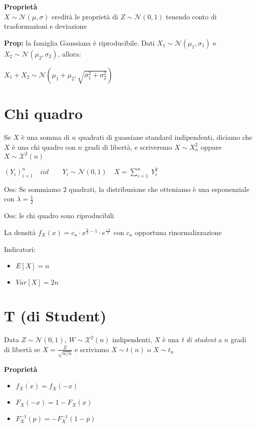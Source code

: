 \documentclass[12pt, a4paper]{article}
\begin{document}
\textbf{Proprietà}\\ $X\sim\mathcal{N}(\mu,\sigma)$ eredità le proprietà di $Z\sim\mathcal{N}(0,1)$
tenendo conto di trasformazioni e deviazione

\textbf{Prop:} la famiglia  Gaussiana è riproducibile. Dati $X_{1}\sim\mathcal{N}(\mu_{1},\sigma_{1})$
e $X_{2}\sim\mathcal{N}(\mu_{2},\sigma_{2})$, allora:
\begin{center}
    $X_{1}+X_{2}\sim\mathcal{N}(\mu_{1}+\mu_{2},\sqrt{\sigma_{1}^{2}+\sigma_{2}^{2}})$
\end{center}

\section{Chi quadro}
Se $X$ è una somma di $n$ quadrati di guassiane standard indipendenti, diciamo
che $X$ è una chi quadro con $n$ gradi di libertà, e scriveremo $X\sim X^{2}_{n}$ oppure 
$X\sim\mathcal{X}^{2}(n)$
\begin{center}
    $(Y_{i})^{n}_{i=1}\quad iid\qquad Y_{i}\sim\mathcal{N}(0,1)\quad X=\sum_{i=1}^{n}\ Y_{i}^{2}$
\end{center}

Oss: Se sommiamo $2$ quadrati, la distribuzione che otteniamo è una esponenziale con 
$\lambda=\frac{1}{2}$

Oss: le chi quadro sono riproducibili

La densità $f_{X}(x)=c_{n}\cdot x^{\frac{n}{2}-1}\cdot e^{\frac{-x}{2}}$ con $c_{n}$ opportuna
rinormalizzazione

Indicatori:
\begin{itemize}
    \item $E[X]=n$
    \item $Var[X]=2n$
\end{itemize}

\section{T (di Student)}
Data $Z\sim\mathcal{N}(0,1),\ W\sim \mathcal{X}^{2}(n)$ indipendenti, $X$ è una \textit{t di student}
a $n$ gradi di libertà se $X=\frac{Z}{\sqrt{w/n}}$ e scriviamo $X\sim t(n)$ o $X\sim t_{n}$

\textbf{Proprietà}
\begin{itemize}
    \item $f_{X}(x)=f_{X}(-x)$
    \item $F_{X}(-x)=1-F_{X}(x)$
    \item $F^{-1}_{X}(p)=-F^{-1}_{X}(1-p)$
\end{itemize}
\end{document}
